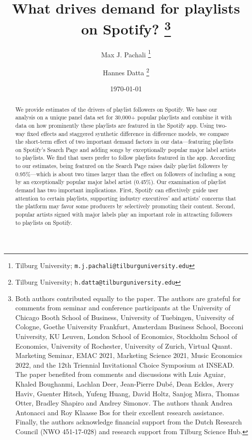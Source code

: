 \documentclass[12pt, a4paper, leqno]{article}
\begin{document}
\begin{titlepage}
\title{
%
\vspace{-1.5cm}
%
What drives demand for playlists on Spotify? 
\thanks{Both authors contributed equally to the paper. The authors are grateful for comments from seminar and conference participants at the University of Chicago Booth School of Business, University of Tuebingen, University of Cologne, Goethe University Frankfurt, Amsterdam Business School, Bocconi University, KU Leuven, London School of Economics, Stockholm School of Economics, University of Rochester, University of Zurich, Virtual Quant. Marketing Seminar, EMAC 2021, Marketing Science 2021, Music Economics 2022, and the 12th Triennial Invitational Choice Symposium at INSEAD. The paper benefited from comments and discussions with Luis Aguiar, Khaled Boughanmi, Lachlan Deer, Jean-Pierre Dub\'e, Dean Eckles, Avery Haviv, Guenter Hitsch, Yufeng Huang, David Holtz, Sanjog Misra, Thomas Otter, Bradley Shapiro and Andrey Simonov. 
The authors thank Andrea Antonacci and Roy Klaasse Bos for their excellent research assistance. Finally, the authors acknowledge financial support from the Dutch Research Council (NWO 451-17-028) and research support from Tilburg Science Hub.}
}

\author{
Max J. Pachali
\thanks{Tilburg University; \texttt{m.j.pachali@tilburguniversity.edu}}
\and 
Hannes Datta
\thanks{Tilburg University; \texttt{h.datta@tilburguniversity.edu}}}
\date{\today}
\maketitle
\begin{abstract}

We provide estimates of the drivers of playlist followers on Spotify. We base our analysis on a unique panel data set for 30,000+ popular playlists and combine it with data on how prominently these playlists are featured in the Spotify app. Using two-way fixed effects and staggered synthetic difference in difference models, we compare the short-term effect of two important demand factors in our data---featuring playlists on Spotify's Search Page and adding songs by exceptionally popular major label artists to playlists. We find that users prefer to follow playlists featured in the app. According to our estimates, being featured on the Search Page raises daily playlist followers by 0.95\%---which is about two times larger than the effect on followers of including a song by an exceptionally popular major label artist (0.45\%). Our examination of playlist demand has two important implications. First, Spotify can effectively guide user attention to certain playlists, supporting industry executives' and artists' concerns that the platform may favor some producers by selectively promoting their content. Second, popular artists signed with major labels play an important role in attracting followers to playlists on Spotify.


\end{abstract}
\end{titlepage}
\end{document}
